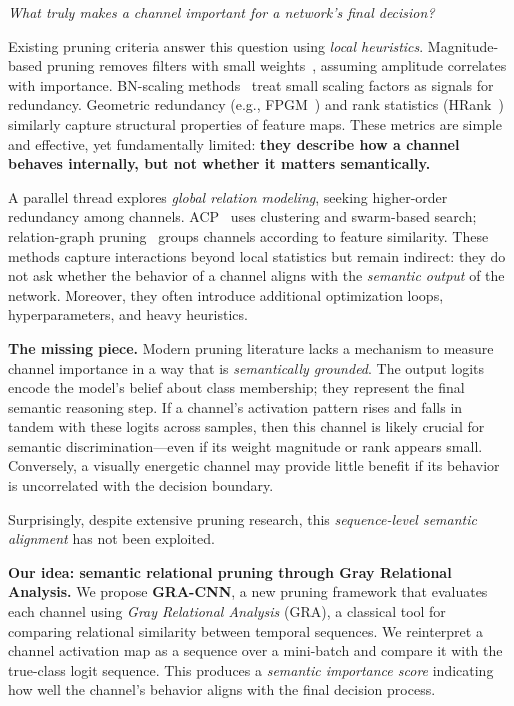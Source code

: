 \documentclass[sn-mathphys,Numbered]{sn-jnl}
\begin{document}
\emph{What truly makes a channel important for a network’s final decision?}

Existing pruning criteria answer this question using \emph{local heuristics}. Magnitude-based pruning removes filters with small weights~\cite{he2017channel}, assuming amplitude correlates with importance. BN-scaling methods~\cite{liu2017network_slimming} treat small scaling factors as signals for redundancy. Geometric redundancy (e.g., FPGM~\cite{he2019fpgm}) and rank statistics (HRank~\cite{lin2020hrank}) similarly capture structural properties of feature maps. These metrics are simple and effective, yet fundamentally limited:  
\textbf{they describe how a channel behaves internally, but not whether it matters semantically.}

A parallel thread explores \emph{global relation modeling}, seeking higher-order redundancy among channels. ACP~\cite{chang2022acp} uses clustering and swarm-based search; relation-graph pruning~\cite{hu2023dynamic_pruning,li2023lightweight_dnn} groups channels according to feature similarity. These methods capture interactions beyond local statistics but remain indirect: they do not ask whether the behavior of a channel aligns with the \emph{semantic output} of the network. Moreover, they often introduce additional optimization loops, hyperparameters, and heavy heuristics.

\vspace{0.5em}
\noindent\textbf{The missing piece.}  
Modern pruning literature lacks a mechanism to measure channel importance in a way that is \emph{semantically grounded}. The output logits encode the model’s belief about class membership; they represent the final semantic reasoning step. If a channel's activation pattern rises and falls in tandem with these logits across samples, then this channel is likely crucial for semantic discrimination—even if its weight magnitude or rank appears small. Conversely, a visually energetic channel may provide little benefit if its behavior is uncorrelated with the decision boundary.

Surprisingly, despite extensive pruning research, this \emph{sequence-level semantic alignment} has not been exploited.

\vspace{0.5em}
\noindent\textbf{Our idea: semantic relational pruning through Gray Relational Analysis.}  
We propose \textbf{GRA-CNN}, a new pruning framework that evaluates each channel using \emph{Gray Relational Analysis} (GRA), a classical tool for comparing relational similarity between temporal sequences. We reinterpret a channel activation map as a sequence over a mini-batch and compare it with the true-class logit sequence. This produces a \emph{semantic importance score} indicating how well the channel’s behavior aligns with the final decision process.
\end{document}
